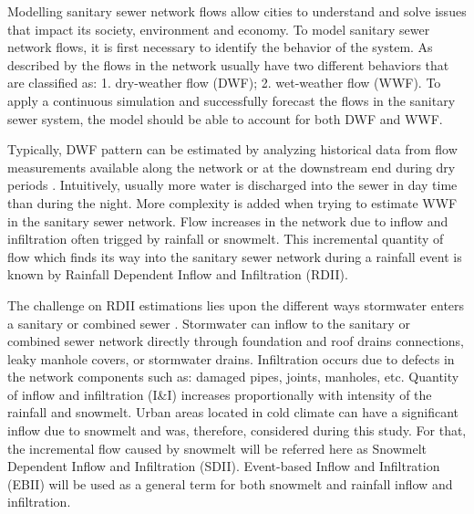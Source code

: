 Modelling sanitary sewer network flows allow cities to understand and solve issues that impact its society, environment and economy. To model sanitary sewer network flows, it is first necessary to identify the behavior of the system. As described by \citet{Vallabhaneni2007} the flows in the network usually have two different behaviors that are classified as: 1. dry-weather flow (DWF); 2. wet-weather flow (WWF). To apply a continuous simulation and successfully forecast the flows in the sanitary sewer system, the model should be able to account for both DWF and WWF.

Typically, DWF pattern can be estimated by analyzing historical data from flow measurements available along the network or at the downstream end during dry periods \cite{Bennett1999}. Intuitively, usually more water is discharged into the sewer in day time than during the night. More complexity is added when trying to estimate WWF in the sanitary sewer network. Flow increases in the network due to inflow and infiltration often trigged by rainfall or snowmelt. This incremental quantity of flow which finds its way into the sanitary sewer network during a rainfall event is known by Rainfall Dependent Inflow and Infiltration (RDII).

The challenge on RDII estimations lies upon the different ways stormwater enters a sanitary or combined sewer \cite{Mosley2001}. Stormwater can inflow to the sanitary or combined sewer network directly through foundation and roof drains connections, leaky manhole covers, or stormwater drains.  Infiltration occurs due to defects in the network components such as: damaged pipes, joints, manholes, etc. \cite{Rossman2016}
Quantity of inflow and infiltration (I\&I) increases proportionally with intensity of the rainfall and snowmelt. Urban areas located in cold climate can have a significant inflow due to snowmelt and was, therefore, considered during this study. For that, the incremental flow caused by snowmelt will be referred here as Snowmelt Dependent Inflow and Infiltration (SDII). Event-based Inflow and Infiltration (EBII) will be used as a general term for both snowmelt and rainfall inflow and infiltration.


